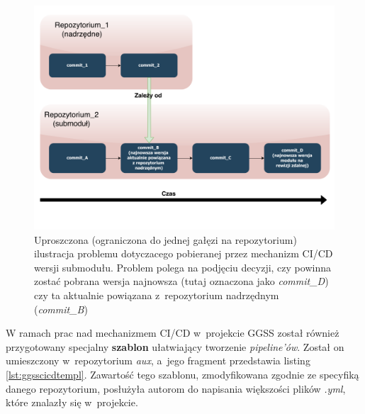 \begin{figure}[H]
\centering
\caption{Uproszczona (ograniczona do jednej gałęzi na repozytorium) ilustracja problemu dotyczacego pobieranej przez mechanizm CI/CD wersji submodułu. Problem polega na podjęciu decyzji, czy powinna zostać pobrana wersja najnowsza (tutaj oznaczona jako \textit{commit\_D}) czy ta aktualnie powiązana z~repozytorium nadrzędnym (\textit{commit\_B})}
\label{fig:submoduleProblem}
\includegraphics[width=\textwidth]{res/SubmodulesProblem}
\end{figure}

\newpage

W ramach prac nad mechanizmem CI/CD w~projekcie GGSS został również przygotowany specjalny \textbf{szablon} ułatwiający tworzenie \textit{pipeline'ów}. Został on umieszczony w~repozytorium \textit{aux}, a~jego fragment przedstawia listing \ref{lst:ggsscicdtempl}. Zawartość tego szablonu, zmodyfikowana zgodnie ze specyfiką danego repozytorium, posłużyła autorom do napisania większości plików \textit{.yml}, które znalazły się w~projekcie.

